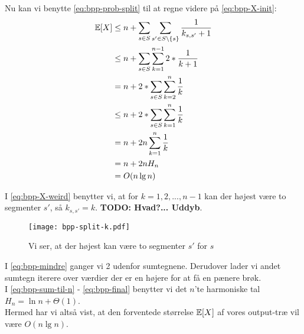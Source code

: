 Nu kan vi benytte \cref{eq:bpp-prob-split} til at regne videre på \cref{eq:bpp-X-init}:
\begin{align}
{\mathbb E}[X] &\leq n + \sum_{s \in S} \sum_{s' \in S \backslash \{ s\}} \frac{1}{k_{s, s'}+1} \nonumber \\
      &\leq n + \sum_{s \in S} \sum_{k=1}^{n-1} 2 * \frac{1}{k+1} \label{eq:bpp-X-weird} \\
      &= n + 2 * \sum_{s \in S} \sum_{k=2}^{n} \frac{1}{k} \label{eq:bpp-mindre} \\
      &\leq n + 2 * \sum_{s \in S} \sum_{k=1}^{n} \frac{1}{k} \nonumber \\
      &= n + 2n \sum_{k=1}^{n} \frac{1}{k} \label{eq:bpp-sum-til-n} \\
      &= n + 2n H_n \label{eq:bpp-harmonic} \\
      &= O(n \lg n) \label{eq:bpp-final}
\end{align}

I \cref{eq:bpp-X-weird} benytter vi, at for $k = 1,2, ..., n-1$ kan der højest være to segmenter $s'$, så $k_{s, s'} = k$. \textbf{TODO: Hvad?... Uddyb}.
\begin{figure}[H]
    \begin{center}
    \texttt{[image: bpp-split-k.pdf]}
    \end{center}
    \caption{Vi ser, at der højest kan være to segmenter $s'$ for $s$}
    \label{fig:bpp-split-k}
\end{figure}

I \cref{eq:bpp-mindre} ganger vi 2 udenfor sumtegnene. Derudover lader vi andet sumtegn iterere over værdier der er en højere for at få en pænere brøk.\\
I \cref{eq:bpp-sum-til-n} - \cref{eq:bpp-final} benytter vi det $n$'te harmoniske tal $H_n = \ln n + \Theta(1)$.\\

Hermed har vi altså vist, at den forventede størrelse ${\mathbb E}[X]$ af vores output-træ vil være $O(n \lg n)$.

